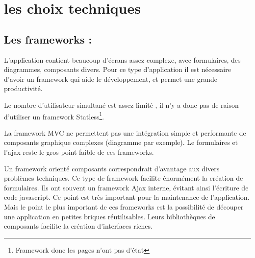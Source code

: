 \newpage{}
\chapter{les choix techniques}


\section{Les frameworks :}

L'application contient beaucoup d'écrans assez complexe, avec formulaires,
des diagrammes, composants divers. Pour ce type d'application il est nécessaire
d'avoir un framework qui aide le développement, et permet une grande productivité.

Le nombre d'utilisateur simultané est assez limité , il n'y a donc pas de raison
d'utiliser un framework Statless\footnote{Framework donc les pages n'ont pas d’état}.

La framework MVC ne permettent pas une intégration simple et performante de composants
graphique complexes (diagramme par exemple). Le formulaires et l'ajax reste le gros point
faible de ces frameworks.

Un framework orienté composants correspondrait d'avantage aux divers problèmes techniques. 
Ce type de framework facilite énormément la création de formulaires. Ils ont souvent un 
framework Ajax interne, évitant ainsi l'écriture de code javascript. Ce point est très important
pour la maintenance de l'application. Mais le point le plus important de ces frameworks est
la possibilité de découper une application en petites briques réutilisables. Leurs bibliothèques
de composants facilite la création d'interfaces riches.


